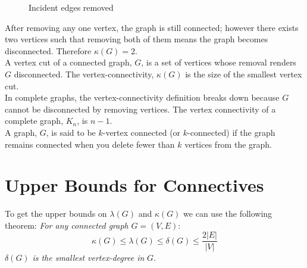\begin{minipage}{0.3\textwidth}
    \begin{figure}[H]
        \centering
        \caption{Incident edges removed}
    \end{figure}
\end{minipage} \vspace{0.5em}

After removing any one vertex, the graph is still connected; however there exists two vertices such that removing both of them means the graph becomes disconnected. Therefore $\kappa(G) = 2$. \\

A vertex cut of a connected graph, $G$, is a set of vertices whose removal renders $G$ disconnected. The vertex-connectivity, $\kappa(G)$ is the size of the smallest vertex cut.\\

In complete graphs, the vertex-connectivity definition breaks down because $G$ cannot be disconnected by removing vertices. The vertex connectivity of a complete graph, $K_n$, is $n-1$.\\

A graph, $G$, is said to be $k$-vertex connected (or $k$-connected) if the graph remains connected when you delete fewer than $k$ vertices from the graph.

\section{Upper Bounds for Connectives}
To get the upper bounds on $\lambda(G)$ and $\kappa(G)$ we can use the following theorem: \textit{For any connected graph} $G = (V, E)$:
\[\kappa(G) \leq \lambda (G) \leq \delta (G) \leq \frac{2|E|}{|V|}\]
$\delta(G)$ \textit{is the smallest vertex-degree in} $G$.\\


